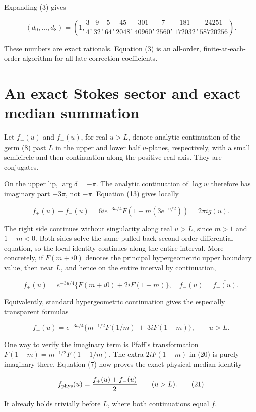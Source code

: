 \documentclass[11pt,letterpaper]{article}
\theoremstyle{remark}
\begin{document}
Expanding (3) gives

\[
(d_0,\ldots,d_8)=\left(1,\frac34,\frac9{32},\frac5{64},\frac{45}{2048},
\frac{301}{40960},\frac7{2560},\frac{181}{172032},\frac{24251}{58720256}\right).
\tag{18}
\]

These numbers are exact rationals. Equation (3) is an all-order,
finite-at-each-order algorithm for all late correction coefficients.

\section{An exact Stokes sector and exact median
summation}\label{an-exact-stokes-sector-and-exact-median-summation}

Let \(f_+(u)\) and \(f_-(u)\), for real \(u>L\), denote analytic
continuation of the germ (8) past \(L\) in the upper and lower half
\(u\)-planes, respectively, with a small semicircle and then
continuation along the positive real axis. They are conjugates.

On the upper lip, \(\arg\delta=-\pi\). The analytic continuation of
\(\log w\) therefore has imaginary part \(-3\pi\), not \(-\pi\).
Equation (13) gives locally

\[
f_+(u)-f_-(u)=6i e^{-3u/4}F(1-m(3e^{-u/2}))=2\pi i g(u).
\tag{19}
\]

The right side continues without singularity along real \(u>L\), since
\(m>1\) and \(1-m<0\). Both sides solve the same pulled-back
second-order differential equation, so the local identity continues
along the entire interval. More concretely, if \(F(m+i0)\) denotes the
principal hypergeometric upper boundary value, then near \(L\), and
hence on the entire interval by continuation,

\[
f_+(u)=e^{-3u/4}\{F(m+i0)+2iF(1-m)\},
\quad f_-(u)=\overline{f_+(u)}.
\tag{20}
\]

Equivalently, standard hypergeometric continuation gives the especially
transparent formulas

\[
f_\pm(u)=e^{-3u/4}\{m^{-1/2}F(1/m)\ \pm\ 3iF(1-m)\},\qquad u>L.
\tag{20a}
\]

One way to verify the imaginary term is Pfaff's transformation
\(F(1-m)=m^{-1/2}F(1-1/m)\). The extra \(2iF(1-m)\) in (20) is purely
imaginary there. Equation (7) now proves the exact physical-median
identity

\[
f_{\rm phys}(u)=\frac{f_+(u)+f_-(u)}2\qquad(u>L).
\tag{21}
\]

It already holds trivially before \(L\), where both continuations equal
\(f\).
\end{document}
